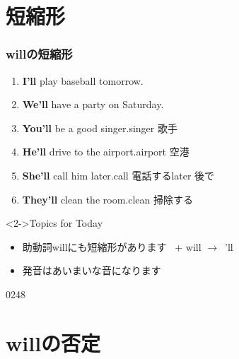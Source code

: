 \documentclass[aspectratio=169,xcolor={dvipsnames,table}]{beamer}
\newcommand{\myaudio}[1]{\href{#1}{\faVolumeUp}}
\begin{document}
\section{短縮形}
\begin{frame}[plain]\frametitle{willの短縮形}

\begin{enumerate}
 \item {\bfseries I'll} play baseball tomorrow.
 \item {\bfseries We'll} have a party on Saturday.
 \item {\bfseries You'll} be a  good singer.\hfill{\scriptsize singer  歌手}
 \item {\bfseries He'll} drive to the airport.\hfill{\scriptsize airport  空港}
 \item {\bfseries She'll} call him later.\hfill{\scriptsize call  電話する\hspace{8pt}later  後で}
 \item {\bfseries They'll} clean the room.\hfill{\scriptsize clean  掃除する}
\end{enumerate}

\vfill

\begin{block}<2->{Topics for Today}
\begin{itemize}[square]\small
 \item  助動詞willにも短縮形があります\
\hfill{} $+$ will $\longrightarrow$ \,'ll\hfill\mbox{}

 \item 発音はあいまいな音になります%
 \end{itemize}
     \end{block}

\mbox{}\hfill{\tiny 0248}\,{\scriptsize \myaudio{./audio/012_will_03a.mp3}}
\end{frame}
\section{willの否定}
\end{document}
